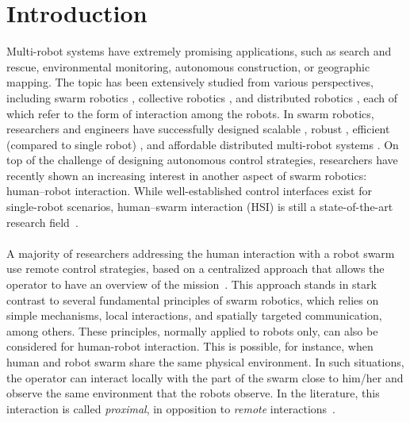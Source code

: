 \documentclass[smallextended]{svjour3}
\begin{document}
\section{Introduction}
\label{sec:introduction}
Multi-robot systems have extremely promising applications, such as search and rescue, environmental monitoring, autonomous construction, or geographic mapping. 
The topic has been extensively studied from various perspectives, including swarm robotics \cite{brambilla2013}, collective robotics \cite{kernbach2013handbook}, and distributed robotics \cite{martinoli2012distributed}, each of which refer to the form of interaction among the robots. 
In swarm robotics, researchers and engineers have successfully designed scalable \cite{rubenstein2012kilobot}, robust \cite{winfield2006safety}, efficient (compared to single robot) \cite{Bonani2012}, and affordable distributed multi-robot systems \cite{rubenstein2014programmable}. 
On top of the challenge of designing autonomous control strategies, researchers have recently shown an increasing interest in another aspect of swarm robotics: human--robot interaction. 
While well-established control interfaces exist for single-robot scenarios, human--swarm interaction (HSI) is still a state-of-the-art research field~\cite{Kolling2016}. \\
\\
A majority of researchers addressing the human interaction with a robot swarm use remote control strategies, based on a centralized approach that allows the operator to have an overview of the mission~\cite{Kolling2016}. 
This approach stands in stark contrast to several fundamental principles of swarm robotics, which relies on simple mechanisms, local interactions, and spatially targeted communication, among others. 
These principles, normally applied to robots only, can also be considered for human-robot interaction.
This is possible, for instance, when human and robot swarm share the same physical environment. 
In such situations, the operator can interact locally with the part of the swarm close to him/her and observe the same environment that the robots observe. 
In the literature, this interaction is called \textit{proximal}, in opposition to \textit{remote} interactions~\cite{Kolling2016}.\\
\\
\end{document}

